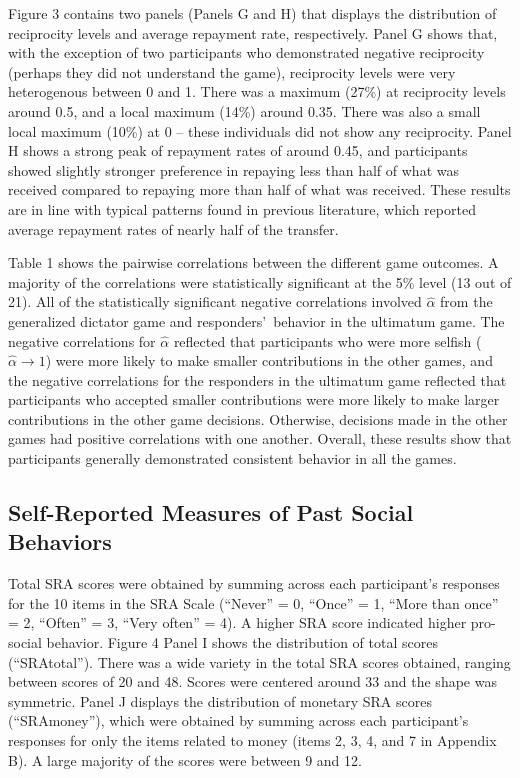 \documentclass[12pt]{article}
\begin{document}
Figure 3 contains two panels (Panels G and H) that displays the distribution of reciprocity levels and average repayment rate, respectively. Panel G shows that, with the exception of two participants who demonstrated negative reciprocity (perhaps they did not understand the game), reciprocity levels were very heterogenous between 0 and 1. There was a maximum (27\%) at reciprocity levels around 0.5, and a local maximum (14\%) around 0.35. There was also a small local maximum (10\%) at 0 -- these individuals did not show any reciprocity. Panel H shows a strong peak of repayment rates of around 0.45, and participants showed slightly stronger preference in repaying less than half of what was received compared to repaying more than half of what was received. These results are in line with typical patterns found in previous literature, which reported average repayment rates of nearly half of the transfer.

Table 1 shows the pairwise correlations between the different game outcomes. A majority of the correlations were statistically significant at the 5\% level (13 out of 21). All of the statistically significant negative correlations involved \(\hat{\alpha}\) from the generalized dictator game and responders\rq \ behavior in the ultimatum game. The negative correlations for \(\hat{\alpha}\) reflected that participants who were more selfish (\(\hat{\alpha} \rightarrow 1\)) were more likely to make smaller contributions in the other games, and the negative correlations for the responders in the ultimatum game reflected that participants who accepted smaller contributions were more likely to make larger contributions in the other game decisions. Otherwise, decisions made in the other games had positive correlations with one another. Overall, these results show that participants generally demonstrated consistent behavior in all the games.

\subsection{Self-Reported Measures of Past Social Behaviors}

Total SRA scores were obtained by summing across each participant\rq s responses for the 10 items in the SRA Scale (``Never'' = 0, ``Once'' = 1, ``More than once'' = 2, ``Often'' = 3, ``Very often'' = 4). A higher SRA score indicated higher pro-social behavior. Figure 4 Panel I shows the distribution of total scores (``SRAtotal''). There was a wide variety in the total SRA scores obtained, ranging between scores of 20 and 48. Scores were centered around 33 and the shape was symmetric. Panel J displays the distribution of monetary SRA scores (``SRAmoney''), which were obtained by summing across each participant\rq s responses for only the items related to money (items 2, 3, 4, and 7 in Appendix B).  A large majority of the scores were between 9 and 12.
\end{document}
